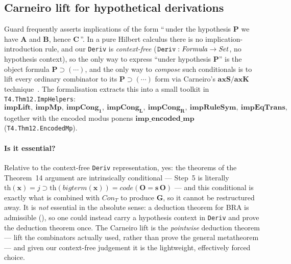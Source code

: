 \documentclass[11pt]{article}
\theoremstyle{plain}
\theoremstyle{definition}
\theoremstyle{remark}
\newcommand{\code}[1]{\mathit{code}(#1)}
\newcommand{\Con}{\mathit{Con}}
\begin{document}
\subsection{Carneiro lift for hypothetical derivations}
\label{sec:carneiro}

Guard frequently asserts implications of the form ``\,under the
hypothesis $\mathbf{P}$ we have $\mathbf{A}$ and $\mathbf{B}$, hence
$\mathbf{C}$\,''.  In a pure Hilbert calculus there is no
implication-introduction rule, and our \verb|Deriv| is
\emph{context-free} ($\verb|Deriv| : \mathit{Formula} \to \mathit{Set}$,
no hypothesis context), so the only way to express ``under hypothesis
$\mathbf{P}$'' is the object formula $\mathbf{P} \supset (\cdots)$, and
the only way to \emph{compose} such conditionals is to lift every
ordinary combinator to its $\mathbf{P} \supset (\cdots)$ form via
Carneiro's $\mathbf{axS}/\mathbf{axK}$ technique~\cite{Carneiro}.  The
formalisation extracts this into a small toolkit in
\verb|T4.Thm12.ImpHelpers|:
\[
\mathbf{impLift},\ \mathbf{impMp},\ \mathbf{impCong_1},\ \mathbf{impCong_L},\ \mathbf{impCong_R},\ \mathbf{impRuleSym},\ \mathbf{impEqTrans},
\]
together with the encoded modus ponens $\mathbf{imp\_encoded\_mp}$
(\verb|T4.Thm12.EncodedMp|).

\paragraph{Is it essential?}  Relative to the context-free
\verb|Deriv| representation, yes: the theorems of the Theorem~14
argument are intrinsically conditional --- Step~5 is literally
$\mathrm{th}(\mathbf{x}) = j \supset \mathrm{th}(\mathit{bigterm}(\mathbf{x}))
= \code{\mathbf{O}=\mathbf{s}\,\mathbf{O}}$ --- and this conditional is
exactly what is combined with $\Con_T$ to produce $\mathbf{G}$, so it
cannot be restructured away.  It is \emph{not} essential in the absolute
sense: a deduction theorem for BRA is admissible (\cite[Exercise~19]{Guard63}),
so one could instead carry a hypothesis context in \verb|Deriv| and prove
the deduction theorem once.  The Carneiro lift is the \emph{pointwise}
deduction theorem --- lift the combinators actually used, rather than
prove the general metatheorem --- and given our context-free judgement it
is the lightweight, effectively forced choice.
\end{document}
